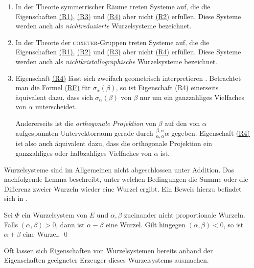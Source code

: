 \begin{bem}
  \begin{enumerate}
    \item In der Theorie symmetrischer Räume treten Systeme auf, die die Eigenschaften \hyperref[it:R1]{(R1)}, \hyperref[it:R3]{(R3)} und \hyperref[it:R4]{(R4)} aber nicht \hyperref[it:R2]{(R2)} erfüllen. 
      Diese Systeme werden auch als \emph{nichtreduzierte} Wurzelsysteme bezeichnet.
    \item In der Theorie der \textsc{coxeter}\hyp{}Gruppen treten Systeme auf, die die Eigenschaften \hyperref[it:R1]{(R1)}, \hyperref[it:R2]{(R2)} und \hyperref[it:R3]{(R3)} aber nicht \hyperref[it:R4]{(R4)} erfüllen.
      Diese Systeme werden auch als \emph{nichtkristallographische} Wurzelsysteme bezeichnet.
    \item Eigenschaft \hyperref[it:R4]{(R4)} lässt sich zweifach geometrisch interpretieren \cite[S.198]{hall2015lie}.
      Betrachtet man die Formel \hyperref[eq:RF]{\hyperref[it:RF]{(RF)}} für $\sigma_\alpha(\beta)$, so ist Eigenschaft (R4) einerseits äquivalent dazu, dass sich $\sigma_\alpha(\beta)$ von $\beta$ nur um ein ganzzahliges Vielfaches von $\alpha$ unterscheidet.

      Andererseits ist die \emph{orthogonale Projektion} von $\beta$ auf den von $\alpha$ aufgespannten Untervektorraum gerade durch $\tfrac{\beta,\alpha}{\alpha,\alpha}\alpha$ gegeben.
      Eigenschaft \hyperref[it:R4]{(R4)} ist also auch äquivalent dazu, dass die orthogonale Projektion ein ganzzahliges oder halbzahliges Vielfaches von $\alpha$ ist.
  \end{enumerate}
\end{bem}

Wurzelsysteme sind im Allgemeinen nicht abgeschlossen unter Addition. 
Das nachfolgende Lemma beschreibt, unter welchen Bedingungen die Summe oder die Differenz zweier Wurzeln wieder eine Wurzel ergibt. Ein Beweis hierzu befindet sich in \cite[S.45]{humphreys1972introduction}.

\begin{lem}
  \label{lem:sumDiffRoot}
  Sei $\Phi$ ein Wurzelsystem von $E$ und $\alpha, \beta$ zueinander nicht proportionale Wurzeln.
  Falls $(\alpha, \beta) > 0$, dann ist $\alpha - \beta$ eine Wurzel.
  Gilt hingegen $(\alpha, \beta) < 0$, so ist $\alpha + \beta$ eine Wurzel. \qed
\end{lem}

Oft lassen sich Eigenschaften von Wurzelsystemen bereits anhand der Eigenschaften geeigneter Erzeuger dieses Wurzelsystems ausmachen.

